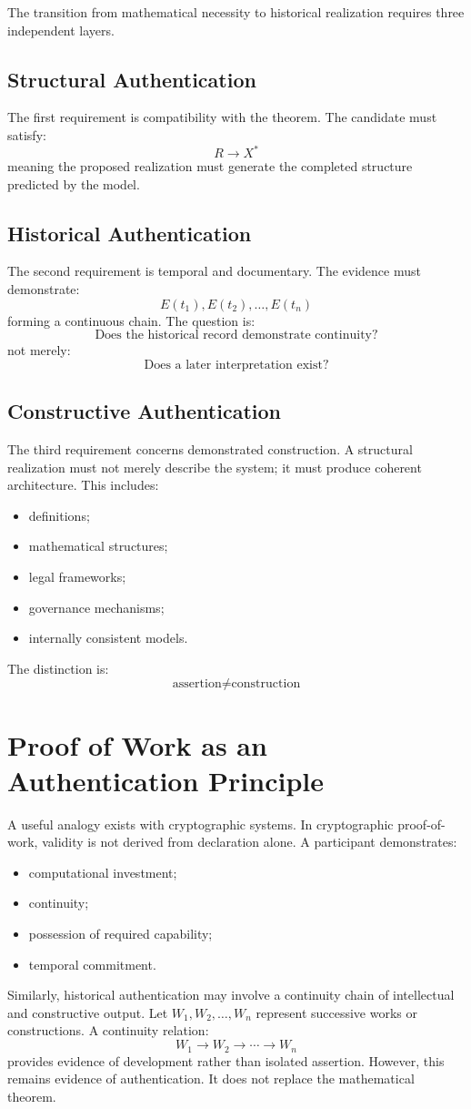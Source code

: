 \documentclass[11pt,openany]{book}
\theoremstyle{plain}
\theoremstyle{definition}
\begin{document}
The transition from mathematical necessity to historical realization requires three independent layers.

\subsection{Structural Authentication}
The first requirement is compatibility with the theorem. The candidate must satisfy:
\[
R \to X^*
\]
meaning the proposed realization must generate the completed structure predicted by the model.

\subsection{Historical Authentication}
The second requirement is temporal and documentary. The evidence must demonstrate:
\[
E(t_1), E(t_2), \ldots, E(t_n)
\]
forming a continuous chain. The question is:
\[
\text{Does the historical record demonstrate continuity?}
\]
not merely:
\[
\text{Does a later interpretation exist?}
\]

\subsection{Constructive Authentication}
The third requirement concerns demonstrated construction. A structural realization must not merely describe the system; it must produce coherent architecture. This includes:
\begin{itemize}
\item definitions;
\item mathematical structures;
\item legal frameworks;
\item governance mechanisms;
\item internally consistent models.
\end{itemize}
The distinction is:
\[
\text{assertion} \neq \text{construction}
\]

\section{Proof of Work as an Authentication Principle}

A useful analogy exists with cryptographic systems. In cryptographic proof-of-work, validity is not derived from declaration alone. A participant demonstrates:
\begin{itemize}
\item computational investment;
\item continuity;
\item possession of required capability;
\item temporal commitment.
\end{itemize}
Similarly, historical authentication may involve a continuity chain of intellectual and constructive output. Let \(W_1, W_2, \ldots, W_n\) represent successive works or constructions. A continuity relation:
\[
W_1 \longrightarrow W_2 \longrightarrow \cdots \longrightarrow W_n
\]
provides evidence of development rather than isolated assertion. However, this remains evidence of authentication. It does not replace the mathematical theorem.
\end{document}
